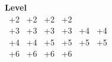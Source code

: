 \begin{minipage}{.2\linewidth}
	\begin{dndtable}
	   	\textbf{Level} \\
		\	+2 \newline
		\	+2 \newline
		\	+2 \newline
		\	+2 \\
		\	+3 \newline
		\	+3 \newline
		\	+3 \newline
		\	+3 \newline
		\	+4 \newline
		\	+4 \\
		\	+4 \newline
		\	+4 \newline
		\	+5 \newline
		\	+5 \newline
		\	+5 \newline
		\	+5 \\
		\	+6 \newline
		\	+6 \newline
		\	+6 \newline
		\	+6
	\end{dndtable}
\end{minipage}
